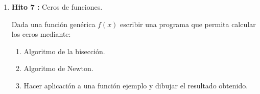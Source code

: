 \documentclass[12pt,spanish]{article}
\begin{document}
\begin{enumerate}
    \item {\bf Hito 7 :}   Ceros de funciones. 
    
  Dada una función genérica $ f(x) $ escribir una programa que permita calcular los ceros mediante: 
 
 
 \begin{enumerate}
   \item Algoritmo de la bisección. 
   \item Algoritmo de Newton. 
   \item Hacer aplicación a una función ejemplo y dibujar el resultado obtenido. 
 \end{enumerate}
 
\end{enumerate}
\end{document}
